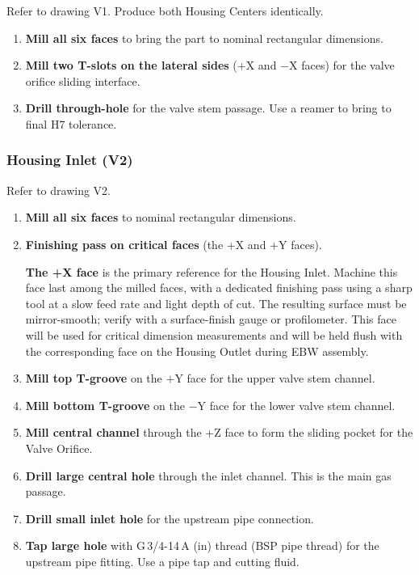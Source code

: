 \documentclass[12pt, letterpaper]{report}%
\newcounter{mycounter}           %
\newcounter{sub}[mycounter]      %
\begin{document}
Refer to drawing V1. Produce both Housing Centers identically.

\begin{enumerate}[itemsep=4pt]
	\item \textbf{Mill all six faces} to bring the part to nominal rectangular dimensions.
	\item \textbf{Mill two T-slots on the lateral sides} ($+$X and $-$X faces) for the
				valve orifice sliding interface.
	\item \textbf{Drill through-hole} for the valve stem passage.
				Use a reamer to bring to final H7 tolerance.
\end{enumerate}

\subsubsection{Housing Inlet (V2)}
\label{sec:mfg:V2}

Refer to drawing V2.

\begin{enumerate}[itemsep=4pt]
	\item \textbf{Mill all six faces} to nominal rectangular dimensions.
	\item \textbf{Finishing pass on critical faces}
				(the $+$X and $+$Y faces).
				\begin{notebox}
				\textbf{The +X face} is the primary reference for the Housing Inlet.
				Machine this face last among the milled faces, with a dedicated finishing pass
				using a sharp tool at a slow feed rate and light depth of cut.
				The resulting surface must be mirror-smooth; verify with a surface-finish
				gauge or profilometer. This face will be used for critical dimension measurements
				and will be held flush with the corresponding face on the Housing Outlet
				during EBW assembly.
				\end{notebox}
	\item \textbf{Mill top T-groove} on the $+$Y face for the upper valve stem channel.
	\item \textbf{Mill bottom T-groove} on the $-$Y face for the lower valve stem channel.
	\item \textbf{Mill central channel} through the +Z face to form the sliding pocket
				for the Valve Orifice.
	\item \textbf{Drill large central hole}
				through the inlet channel. This is the main gas passage.
	\item \textbf{Drill small inlet hole}
				for the upstream pipe connection.
	\item \textbf{Tap large hole} with G\,3/4-14\,A (in) thread (BSP pipe thread) for
				the upstream pipe fitting. Use a pipe tap and cutting fluid.
\end{enumerate}
\end{document}
